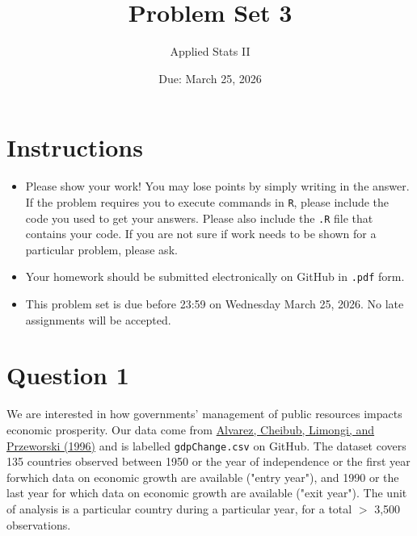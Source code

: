 \documentclass[12pt,letterpaper]{article}
\title{Problem Set 3}
\date{Due: March 25, 2026}
\author{Applied Stats II}
\begin{document}
	\maketitle
	\section*{Instructions}
	\begin{itemize}
	\item Please show your work! You may lose points by simply writing in the answer. If the problem requires you to execute commands in \texttt{R}, please include the code you used to get your answers. Please also include the \texttt{.R} file that contains your code. If you are not sure if work needs to be shown for a particular problem, please ask.
\item Your homework should be submitted electronically on GitHub in \texttt{.pdf} form.
\item This problem set is due before 23:59 on Wednesday March 25, 2026. No late assignments will be accepted.
	\end{itemize}

	\vspace{.25cm}
\section*{Question 1}
\vspace{.25cm}
\noindent We are interested in how governments' management of public resources impacts economic prosperity. Our data come from \href{https://www.researchgate.net/profile/Adam_Przeworski/publication/240357392_Classifying_Political_Regimes/links/0deec532194849aefa000000/Classifying-Political-Regimes.pdf}{Alvarez, Cheibub, Limongi, and Przeworski (1996)} and is labelled \texttt{gdpChange.csv} on GitHub. The dataset covers 135 countries observed between 1950 or the year of independence or the first year forwhich data on economic growth are available ("entry year"), and 1990 or the last year for which data on economic growth are available ("exit year"). The unit of analysis is a particular country during a particular year, for a total $>$ 3,500 observations. 
\end{document}

